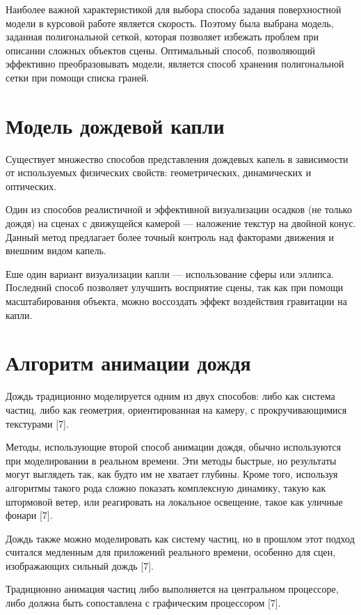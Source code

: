 Наиболее важной характеристикой для выбора способа задания поверхностной модели в курсовой работе является скорость. 
Поэтому была выбрана модель, заданная полигональной сеткой, которая позволяет избежать проблем при описании сложных объектов сцены. 
Оптимальный способ, позволяющий эффективно преобразовывать модели, является способ хранения полигональной сетки при помощи списка граней.

\section{Модель дождевой капли}
\label{sec:dropletmodel}

Существует множество способов представления дождевых капель в зависимости от используемых физических свойств: геометрических, динамических и оптических. 
    
Один из способов реалистичной и эффективной визуализации осадков (не только дождя) на сценах с движущейся камерой --- наложение текстур на двойной конус. 
Данный метод предлагает более точный контроль над факторами движения и внешним видом капель.

Еше один вариант визуализации капли --- использование сферы или эллипса. 
Последний способ позволяет улучшить восприятие сцены, так как при помощи масштабирования объекта, можно воссоздать эффект воздействия гравитации на капли.

\section{Алгоритм анимации дождя}

Дождь традиционно моделируется одним из двух способов: либо как система частиц, либо как геометрия, ориентированная на камеру, с прокручивающимися текстурами [7].

Методы, использующие второй способ анимации дождя, обычно используются при моделировании в реальном времени. 
Эти методы быстрые, но результаты могут выглядеть так, как будто им не хватает глубины. 
Кроме того, используя алгоритмы такого рода сложно показать комплексную динамику, такую как штормовой ветер, или реагировать на локальное освещение, такое как уличные фонари [7].

Дождь также можно моделировать как систему частиц, но в прошлом этот подход считался медленным для приложений реального времени, особенно для сцен, изображающих сильный дождь [7].

Традиционно анимация частиц либо выполняется на центральном процессоре, либо должна быть сопоставлена с графическим процессором [7].

